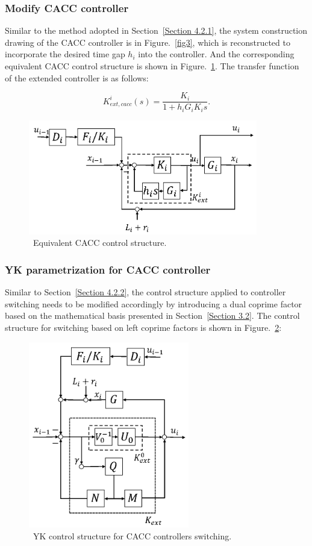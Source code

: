 \documentclass[a4paper,fleqn]{cas-sc}
\begin{document}
\subsubsection{Modify CACC controller}
\label{Section 4.2.3}

Similar to the method adopted in Section~\ref{Section 4.2.1}, the system construction drawing of the CACC controller is in Figure.~\ref{fig3}, which is reconstructed to incorporate the desired time gap $h_i$ into the controller. And the corresponding equivalent CACC control structure is shown in Figure.~\ref{fig7}. The transfer function of the extended controller is as follows:

\begin{equation}
  K_{e x t, c a c c}^{i}(s)=\frac{K_{i}}{1+h_{i} G_{i} K_{i} s}.
\end{equation}

\begin{figure}
  \centering
  \includegraphics[width=10cm]{figs/fig7.png}
  \caption{~Equivalent CACC control structure.}
  \label{fig7}
\end{figure}

\subsubsection{YK parametrization for CACC controller}
\label{Section 4.2.4}

Similar to Section~\ref{Section 4.2.2}, the control structure applied to controller switching needs to be modified accordingly by introducing a dual coprime factor based on the mathematical basis presented in Section~\ref{Section 3.2}. The control structure for switching based on left coprime factors is shown in Figure.~\ref{fig8}:

\begin{figure}
  \centering
  \includegraphics[width=7cm]{figs/fig8.png}
  \caption{~YK control structure for CACC controllers switching.}
  \label{fig8}
\end{figure}
\end{document}
